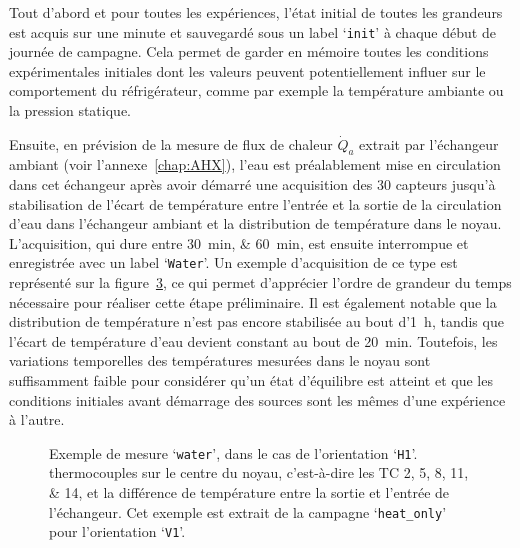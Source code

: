 Tout d'abord et pour toutes les expériences,  l'état initial de toutes les grandeurs est acquis sur une minute et sauvegardé sous un label `\texttt{init}' à chaque début de journée de campagne. Cela permet de garder en mémoire toutes les conditions expérimentales initiales dont les valeurs peuvent potentiellement influer sur le comportement du réfrigérateur, comme par exemple la température ambiante ou la pression statique. \smallskip

Ensuite, en prévision de la mesure de flux de chaleur $\dot Q_a$ extrait par l'échangeur ambiant (voir l'annexe~\ref{chap:AHX}), l'eau est préalablement mise en circulation dans cet échangeur après avoir démarré une acquisition des 30 capteurs jusqu'à stabilisation de l'écart de température entre l'entrée et la sortie de la circulation d'eau dans l'échangeur ambiant et la distribution de température dans le noyau. L'acquisition, qui dure entre \qtylist{30;60}{\minute}, est ensuite interrompue et enregistrée avec un label `\texttt{Water}'. Un exemple d'acquisition de ce type est représenté sur la figure~\ref{fig:WaterOnly}, ce qui permet d'apprécier l'ordre de grandeur du temps nécessaire pour réaliser cette étape préliminaire. Il est également notable que la distribution de température  n'est pas encore stabilisée au bout d'\qty{1}{\hour}, tandis que l'écart de température d'eau devient constant au bout de \qty{20}{\minute}. Toutefois, les variations temporelles des températures mesurées dans le noyau sont suffisamment faible pour considérer qu'un état d'équilibre est atteint et que les conditions initiales avant démarrage des sources sont les mêmes d'une expérience à l'autre.\medskip

\begin{figure}[!ht]
    \centering
	\begin{subfigure}{\textwidth}
		\centering
		
		\caption{}
		\label{fig:WaterOnly_TC}
	\end{subfigure}
		
	\vspace{1em}
	
	\begin{subfigure}{\textwidth}
		\centering
		
		\caption{}
		\label{fig:WaterOnly_PT}
	\end{subfigure}	    
    \caption{Exemple de mesure `\texttt{water}', dans le cas de l'orientation `\texttt{H1}'.  thermocouples sur le centre du noyau, c'est-à-dire les TC \numlist{2;5;8;11;14}, et  la différence de température entre la sortie et l'entrée de l'échangeur. Cet exemple est extrait de la campagne `\texttt{heat\_only}' pour l'orientation `\texttt{V1}'.}
    \label{fig:WaterOnly}
\end{figure}


